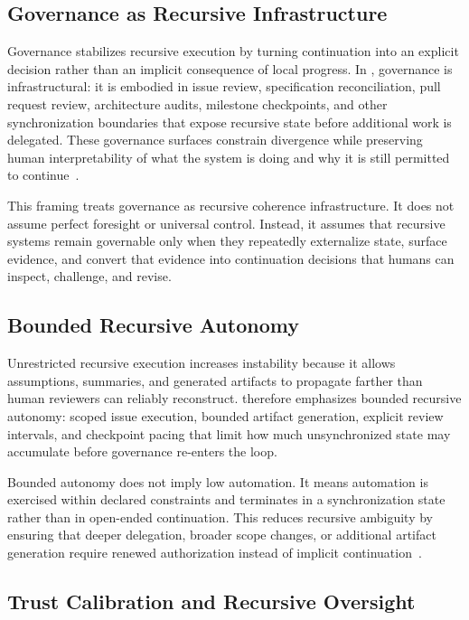 \subsection{Governance as Recursive Infrastructure}

Governance stabilizes recursive execution by turning continuation into an explicit decision rather than an implicit consequence of local progress. In , governance is infrastructural: it is embodied in issue review, specification reconciliation, pull request review, architecture audits, milestone checkpoints, and other synchronization boundaries that expose recursive state before additional work is delegated. These governance surfaces constrain divergence while preserving human interpretability of what the system is doing and why it is still permitted to continue~\cite{Wiener1948Cybernetics,Shneiderman2020HCAI}.

This framing treats governance as recursive coherence infrastructure. It does not assume perfect foresight or universal control. Instead, it assumes that recursive systems remain governable only when they repeatedly externalize state, surface evidence, and convert that evidence into continuation decisions that humans can inspect, challenge, and revise.

\subsection{Bounded Recursive Autonomy}

Unrestricted recursive execution increases instability because it allows assumptions, summaries, and generated artifacts to propagate farther than human reviewers can reliably reconstruct.  therefore emphasizes bounded recursive autonomy: scoped issue execution, bounded artifact generation, explicit review intervals, and checkpoint pacing that limit how much unsynchronized state may accumulate before governance re-enters the loop.

Bounded autonomy does not imply low automation. It means automation is exercised within declared constraints and terminates in a synchronization state rather than in open-ended continuation. This reduces recursive ambiguity by ensuring that deeper delegation, broader scope changes, or additional artifact generation require renewed authorization instead of implicit continuation~\cite{Amershi2014InteractiveML,Simon1957ModelsMan}.

\subsection{Trust Calibration and Recursive Oversight}

